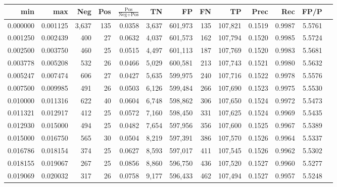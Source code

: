 \begin{tabular}{rrrrrrrrrrrrr}
\toprule
     min &      max &   Neg & Pos & $\frac{\text{Pos}}{\text{Neg}+\text{Pos}}$ &      TN &      FP &      FN &      TP &   Prec &    Rec &   FP/P \\
\midrule
0.000000 & 0.001125 & 3,637 & 135 &                                     0.0358 &   3,637 & 601,973 &     135 & 107,821 & 0.1519 & 0.9987 & 5.5761 \\
0.001250 & 0.002439 &   400 &  27 &                                     0.0632 &   4,037 & 601,573 &     162 & 107,794 & 0.1520 & 0.9985 & 5.5724 \\
0.002500 & 0.003750 &   460 &  25 &                                     0.0515 &   4,497 & 601,113 &     187 & 107,769 & 0.1520 & 0.9983 & 5.5681 \\
0.003778 & 0.005208 &   532 &  26 &                                     0.0466 &   5,029 & 600,581 &     213 & 107,743 & 0.1521 & 0.9980 & 5.5632 \\
0.005247 & 0.007474 &   606 &  27 &                                     0.0427 &   5,635 & 599,975 &     240 & 107,716 & 0.1522 & 0.9978 & 5.5576 \\
0.007500 & 0.009985 &   491 &  26 &                                     0.0503 &   6,126 & 599,484 &     266 & 107,690 & 0.1523 & 0.9975 & 5.5530 \\
0.010000 & 0.011316 &   622 &  40 &                                     0.0604 &   6,748 & 598,862 &     306 & 107,650 & 0.1524 & 0.9972 & 5.5473 \\
0.011321 & 0.012917 &   412 &  25 &                                     0.0572 &   7,160 & 598,450 &     331 & 107,625 & 0.1524 & 0.9969 & 5.5435 \\
0.012930 & 0.015000 &   494 &  25 &                                     0.0482 &   7,654 & 597,956 &     356 & 107,600 & 0.1525 & 0.9967 & 5.5389 \\
0.015000 & 0.016750 &   565 &  30 &                                     0.0504 &   8,219 & 597,391 &     386 & 107,570 & 0.1526 & 0.9964 & 5.5337 \\
0.016786 & 0.018154 &   374 &  25 &                                     0.0627 &   8,593 & 597,017 &     411 & 107,545 & 0.1526 & 0.9962 & 5.5302 \\
0.018155 & 0.019067 &   267 &  25 &                                     0.0856 &   8,860 & 596,750 &     436 & 107,520 & 0.1527 & 0.9960 & 5.5277 \\
0.019069 & 0.020032 &   317 &  26 &                                     0.0758 &   9,177 & 596,433 &     462 & 107,494 & 0.1527 & 0.9957 & 5.5248 \\

\end{tabular}
